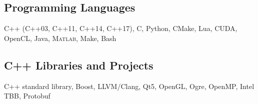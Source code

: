 
\subsection{Programming Languages}

C++ (C++03, C++11, C++14, C++17), C, Python, CMake, Lua, CUDA, OpenCL, Java, \textsc{Matlab}, Make, Bash

\subsection{C++ Libraries and Projects}
C++ standard library, Boost, LLVM/Clang, Qt5, OpenGL, Ogre, OpenMP, Intel TBB, Protobuf

